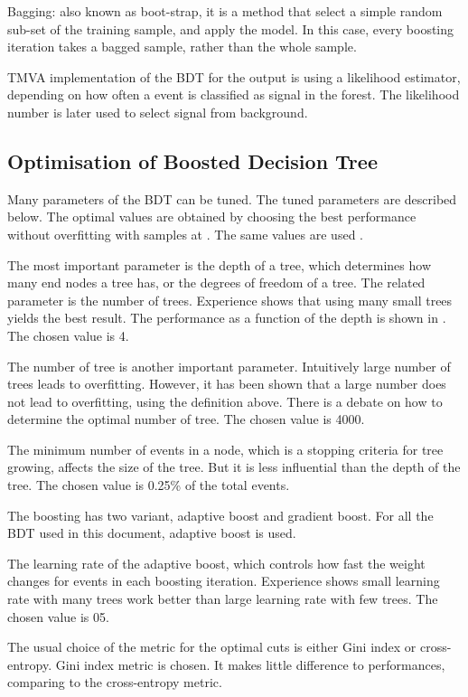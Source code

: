 Bagging: also known as boot-strap, it is a method that select a simple random sub-set of the training sample, and apply the model. In this case, every boosting iteration takes a bagged sample, rather than the whole sample.

TMVA implementation of the BDT for the output is using a likelihood estimator, depending on how often a event is classified as signal in the forest. The likelihood number is later used to select signal from background.


\subsection{Optimisation of Boosted Decision Tree}

Many parameters of the BDT can be tuned. The tuned parameters are described below. The optimal values are obtained by choosing the best performance without overfitting with samples at . The same values are used .

The most important parameter is the depth of a tree, which determines how many end nodes a tree has, or the degrees of freedom of a tree. The related parameter is the number of trees. Experience shows that using many small trees yields the best result. The performance as a function of the depth is shown in . The chosen value is 4.

The number of tree is another important parameter. Intuitively large number of trees leads to overfitting. However, it has been shown that a large number does not lead to overfitting, using the definition above. There is a debate on how to determine the optimal number of tree. The chosen value is 4000.

The minimum number of events in a node, which is a stopping criteria for tree growing, affects the size of the tree. But it is less influential than the depth of the tree. The chosen value is 0.25\% of the total events.

The boosting has two variant, adaptive boost and gradient boost. For all the BDT used in this document, adaptive boost is used.

The learning rate of the adaptive boost, which controls how fast the weight changes for events in each boosting iteration. Experience shows small learning rate with many trees work better than large learning rate with few trees. The chosen value is 05.

The usual choice of the metric for the optimal cuts is either Gini index or cross-entropy. Gini index metric is chosen. It makes little difference to performances, comparing to the cross-entropy metric.

